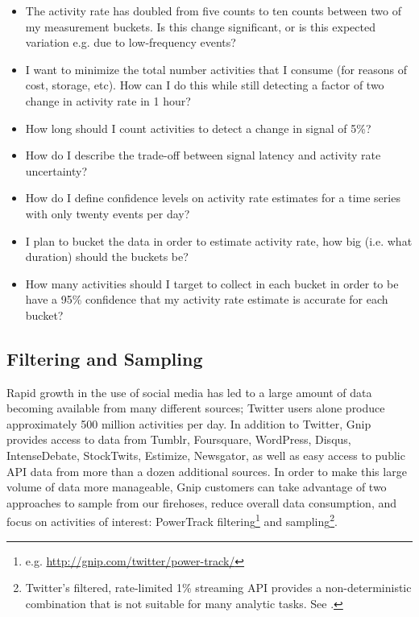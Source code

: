 \documentclass{article}
\begin{document}
\begin{itemize}
	\item The activity rate has doubled from five counts to ten counts between two of my measurement 
buckets. Is this change significant, or is this expected variation e.g. due to low-frequency events?
	\item I want to minimize the total number activities that I consume (for reasons of cost, storage, etc). 
How can I do this while still detecting a factor of two change in activity rate in 1 hour?
	\item How long should I count activities to detect a change in signal of 5\%?
	\item How do I describe the trade-off between signal latency and activity rate uncertainty?
	\item How do I define confidence levels on activity rate estimates for a time series with only twenty 
events per day?
	\item I plan to bucket the data in order to estimate activity rate, how big (i.e. what duration) should 
the buckets be? 
	\item How many activities should I target to collect in each bucket in order to be have a 95\% 
confidence that my activity rate estimate is accurate for each bucket? 
\end{itemize}


\subsection{Filtering and Sampling} 
\label{filter}


Rapid growth in the use of social media has led to a large amount of data becoming available 
from many different sources; Twitter users alone produce approximately 500 million activities per day. 
In addition to Twitter, Gnip provides access to data from Tumblr, Foursquare, WordPress, Disqus, 
IntenseDebate, StockTwits, Estimize, Newsgator, as well as easy access to public API data from more than a dozen 
additional sources. In order to make this large volume of data more manageable, Gnip customers can take 
advantage of two approaches to sample from our firehoses, reduce overall data consumption, and focus 
on activities of interest: PowerTrack filtering\footnote{e.g. \url{http://gnip.com/twitter/power-track/} } 
and sampling\footnote{Twitter's filtered, rate-limited 1\% streaming API provides a non-deterministic 
combination that is not suitable for many analytic tasks.  See \cite{Morstatter:2013}.}. 
\end{document}
